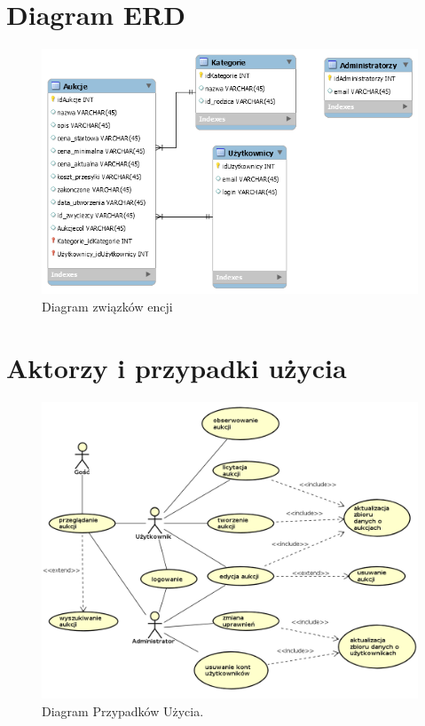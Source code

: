 \documentclass[brudnopis]{xmgr}
\begin{document}
\section{Diagram ERD}

\begin{figure}[!tbh]
\centering
\includegraphics[width=\linewidth]{erd}
\caption{Diagram związków encji\label{RYS.1}}
\end{figure}

\newpage

\section{Aktorzy i przypadki użycia}
\begin{figure}[!tbh]
\centering
\includegraphics[width=\linewidth]{fig/ucdiagram}
\caption{Diagram Przypadków Użycia.}
\end{figure}
\end{document}
